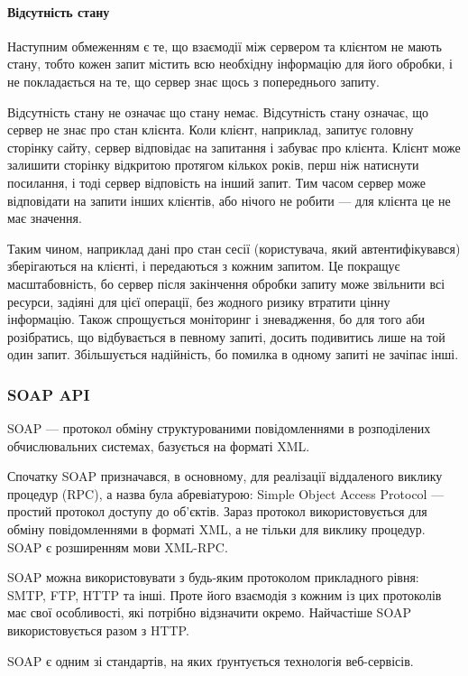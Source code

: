\paragraph{Відсутність стану}
Наступним обмеженням є те, що взаємодії між сервером та клієнтом не мають стану, тобто кожен запит містить всю необхідну інформацію для його обробки, і не покладається на те, що сервер знає щось з попереднього запиту.

Відсутність стану не означає що стану немає. Відсутність стану означає, що сервер не знає про стан клієнта. Коли клієнт, наприклад, запитує головну сторінку сайту, сервер відповідає на запитання і забуває про клієнта. Клієнт може залишити сторінку відкритою протягом кількох років, перш ніж натиснути посилання, і тоді сервер відповість на інший запит. Тим часом сервер може відповідати на запити інших клієнтів, або нічого не робити — для клієнта це не має значення.

Таким чином, наприклад дані про стан сесії (користувача, який автентифікувався) зберігаються на клієнті, і передаються з кожним запитом. Це покращує масштабовність, бо сервер після закінчення обробки запиту може звільнити всі ресурси, задіяні для цієї операції, без жодного ризику втратити цінну інформацію. Також спрощується моніторинг і зневадження, бо для того аби розібратись, що відбувається в певному запиті, досить подивитись лише на той один запит. Збільшується надійність, бо помилка в одному запиті не зачіпає інші.

\subsubsection{SOAP API}
SOAP — протокол обміну структурованими повідомленнями в розподілених обчислювальних системах, базується на форматі XML.

Спочатку SOAP призначався, в основному, для реалізації віддаленого виклику процедур (RPC), а назва була абревіатурою: Simple Object Access Protocol — простий протокол доступу до об'єктів. Зараз протокол використовується для обміну повідомленнями в форматі XML, а не тільки для виклику процедур. SOAP є розширенням мови XML-RPC.

SOAP можна використовувати з будь-яким протоколом прикладного рівня: SMTP, FTP, HTTP та інші. Проте його взаємодія з кожним із цих протоколів має свої особливості, які потрібно відзначити окремо. Найчастіше SOAP використовується разом з HTTP.

SOAP є одним зі стандартів, на яких ґрунтується технологія веб-сервісів.

